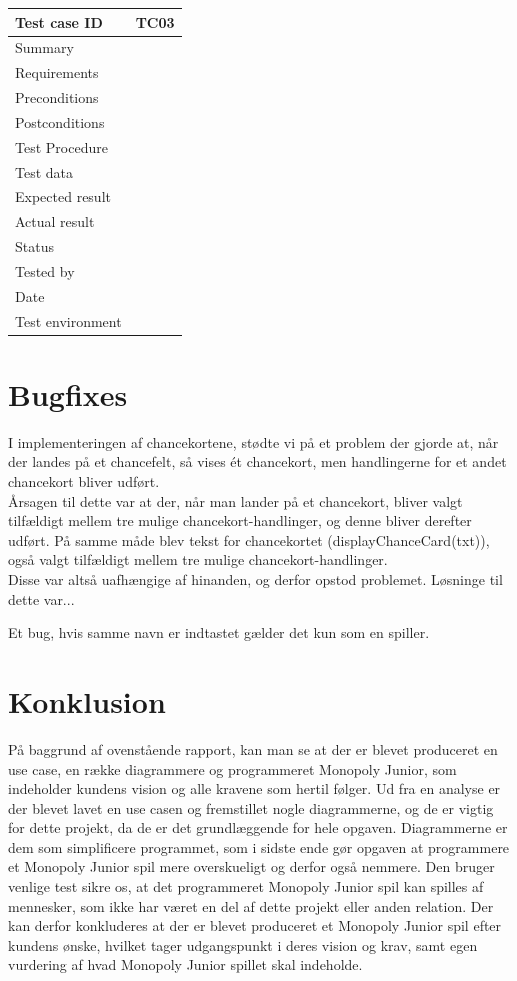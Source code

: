 \documentclass{article}
\begin{document}
\begin{tabular}{ | m{} | m{}|}
    \hline
    Test case ID & TC03  \\
    \hline
    Summary & \\
    \hline
    Requirements & \\
    \hline
    Preconditions & \\
    \hline
    Postconditions & \\
    \hline
    Test Procedure & \\
    \hline
    Test data &  \\
    \hline
    Expected result & \\
    \hline
    Actual result & \\
    \hline
    Status & \\
    \hline
    Tested by & \\
    \hline
    Date & \\
    \hline
    Test environment & \\
    \hline
\end{tabular}

\section{Bugfixes}
I implementeringen af chancekortene, stødte vi på et problem der gjorde at, når der landes på et chancefelt, så vises ét chancekort, men handlingerne for et andet chancekort bliver udført.\\
Årsagen til dette var at der, når man lander på et chancekort, bliver valgt tilfældigt mellem tre mulige chancekort-handlinger, og denne bliver derefter udført. På samme måde blev tekst for chancekortet (displayChanceCard(txt)), også valgt tilfældigt mellem tre mulige chancekort-handlinger. \\
Disse var altså uafhængige af hinanden, og derfor opstod problemet.
Løsninge til dette var...

Et bug, hvis samme navn er indtastet gælder det kun som en spiller.


\section{Konklusion}
På baggrund af ovenstående rapport, kan man se at der er blevet produceret en use case, en række diagrammere og programmeret Monopoly Junior, som indeholder kundens vision og alle kravene som hertil følger. Ud fra en analyse er der blevet lavet en use casen og fremstillet nogle diagrammerne, og de er vigtig for dette projekt, da de
er det grundlæggende for hele opgaven. Diagrammerne er dem som simplificere programmet, som i sidste ende gør opgaven at programmere et Monopoly Junior spil mere overskueligt og derfor også nemmere. Den bruger venlige test sikre os, at det programmeret Monopoly Junior spil kan spilles af mennesker, som ikke har været en del af dette projekt eller anden relation. Der kan derfor konkluderes at der er blevet produceret et Monopoly  Junior spil efter kundens ønske, hvilket tager udgangspunkt i deres vision og krav, samt egen vurdering af hvad Monopoly Junior spillet skal indeholde.  
\end{document}
